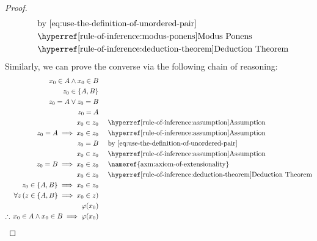 \begin{proof}
\begin{equation*}
\begin{aligned}
            &\quad\text{by \eqref{eq:use-the-definition-of-unordered-pair}}\\
            &\quad\text{\aref{rule-of-inference:modus-ponens}{Modus Ponens}}\\
            &\quad\text{\aref{rule-of-inference:deduction-theorem}{Deduction Theorem}}\\
        \end{aligned}
    \end{equation*}
    Similarly, we can prove the converse via the following chain of reasoning:
    \begin{equation*}
        \begin{aligned}
            x_{0} \in A \land x_{0} \in B& \\
            z_{0} \in \left\{ A,B \right\}& \\
            z_{0} = A \lor z_{0} = B& \\
            z_{0} = A& \\
            x_{0} \in z_{0}& \\
            z_{0} = A \implies x_{0} \in z_{0}& \\
            z_{0} = B& \\
            x_{0} \in z_{0}& \\
            z_{0} = B \implies x_{0} \in z_{0}& \\
            x_{0} \in z_{0}& \\
            z_{0} \in \mleft\{ A,B \mright\} \implies x_{0} \in z_{0}& \\
            \forall z \, \mleft( z \in \mleft\{ A,B \mright\} \implies x_{0} \in z \mright)& \\
            \varphi(x_{0})& \\
            \therefore \, x_{0} \in A \land x_{0} \in B \implies \varphi(x_{0})&
        \end{aligned}
        \text{  }
        \begin{aligned}
            &\quad\text{\aref{rule-of-inference:assumption}{Assumption}}\\
            &\quad\text{\aref{rule-of-inference:assumption}{Assumption}}\\
            &\quad\text{by \eqref{eq:use-the-definition-of-unordered-pair}}\\
            &\quad\text{\aref{rule-of-inference:assumption}{Assumption}}\\
            &\quad\text{\nameref{axm:axiom-of-extensionality}}\\
            &\quad\text{\aref{rule-of-inference:deduction-theorem}{Deduction Theorem}}\\

\end{aligned}
\end{equation*}
\end{proof}
